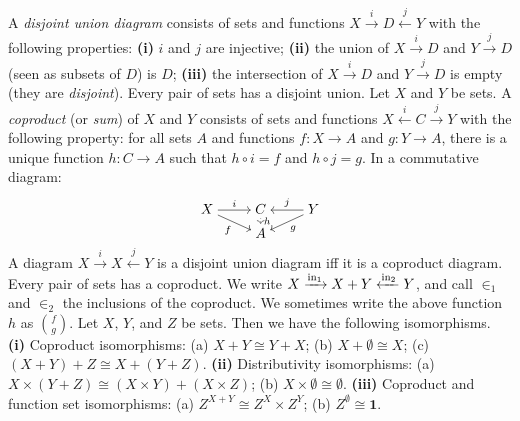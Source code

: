  A \textit{disjoint union diagram} consists of sets and functions $X \xrightarrow{i} D \xleftarrow{j} Y$ with the following properties: \textbf{(i)} $i$ and $j$ are injective; \textbf{(ii)} the union of $X \xrightarrow{i} D$ and $Y \xrightarrow{j} D$ (seen as subsets of $D$) is $D$; \textbf{(iii)} the intersection of $X \xrightarrow{i} D$ and $Y \xrightarrow{j} D$ is empty (they are \textit{disjoint}).
 Every pair of sets has a disjoint union.
 Let $X$ and $Y$ be sets. A \textit{coproduct } (or \textit{sum}) of $X$ and $Y$ consists of sets and functions $X \xleftarrow{i} C \xrightarrow{j} Y$ with the following property: for all sets $A$ and functions $f \colon X \to A$ and $g \colon Y \to A$, there is a unique function $h \colon C \to A$ such that $h \circ i = f$ and $h \circ j = g$. In a commutative diagram:
\[\begin{tikzcd}[cramped,row sep=tiny]
    X & C & Y \\
    & A
    \arrow["i", from=1-1, to=1-2]
    \arrow["f"', from=1-1, to=2-2]
    \arrow["h", dotted, from=1-2, to=2-2]
    \arrow["j"', from=1-3, to=1-2]
    \arrow["g", from=1-3, to=2-2]
\end{tikzcd}\]
 A diagram $X \xrightarrow{i} X \xleftarrow{j} Y$ is a disjoint union diagram iff it is a coproduct diagram.
 Every pair of sets has a coproduct.
 We write $X \xrightarrow{\operatorname{in}_1} X + Y \xleftarrow{\operatorname{in}_2} Y$, and call $\in_1$ and $\in_2$ the inclusions of the coproduct. We sometimes write the above function $h$ as $\binom{f}{g}$.
 Let $X$, $Y$, and $Z$ be sets. Then we have the following isomorphisms. \textbf{(i)} Coproduct isomorphisms: (a) $X + Y \cong Y + X$; (b) $X + \emptyset \cong X$; (c) $(X + Y) + Z \cong X + (Y + Z)$. \textbf{(ii)} Distributivity isomorphisms: (a) $X \times (Y + Z) \cong (X \times Y) + (X \times Z)$; (b) $X \times \emptyset \cong \emptyset$. \textbf{(iii)} Coproduct and function set isomorphisms: (a) $Z^{X + Y} \cong Z^X \times Z^Y$; (b) $Z^{\emptyset} \cong \mathbf{1}$.
